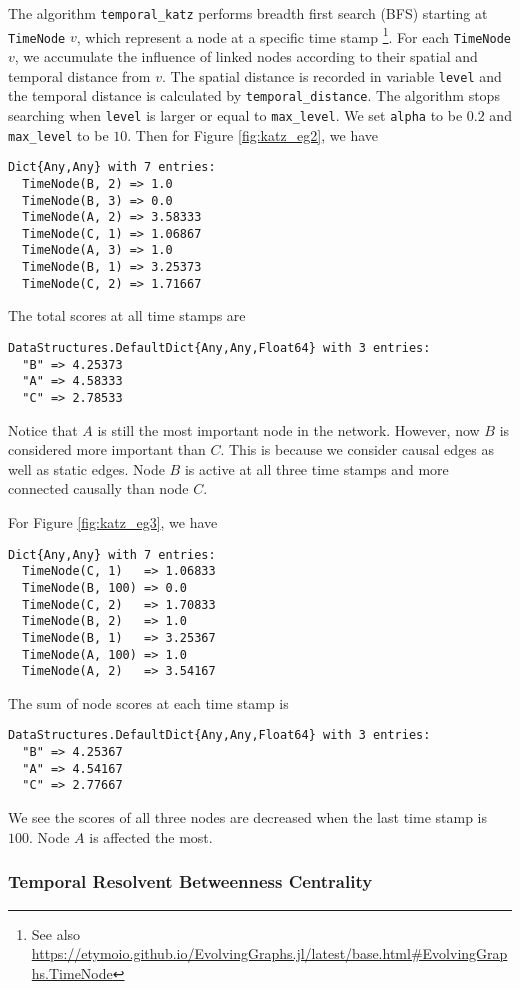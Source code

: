 \documentclass[12pt]{article}
\theoremstyle{definition}
\begin{document}
The algorithm \texttt{temporal\_katz} performs breadth first search (BFS) starting at \texttt{TimeNode} $v$, which represent a node at a specific time stamp \footnote{See also \url{https://etymoio.github.io/EvolvingGraphs.jl/latest/base.html#EvolvingGraphs.TimeNode}}.
For each \texttt{TimeNode} $v$, we accumulate the influence of linked nodes according to their spatial and temporal
distance from $v$. The spatial distance is recorded in variable \texttt{level} and the temporal distance is calculated by
\texttt{temporal\_distance}. The algorithm stops searching when \texttt{level} is larger or equal to \texttt{max\_level}.
We set \texttt{alpha} to be $0.2$ and \texttt{max\_level} to be $10$. Then
for Figure \ref{fig:katz_eg2}, we have
\begin{lstlisting}
Dict{Any,Any} with 7 entries:
  TimeNode(B, 2) => 1.0
  TimeNode(B, 3) => 0.0
  TimeNode(A, 2) => 3.58333
  TimeNode(C, 1) => 1.06867
  TimeNode(A, 3) => 1.0
  TimeNode(B, 1) => 3.25373
  TimeNode(C, 2) => 1.71667
\end{lstlisting}
The total scores at all time stamps are
\begin{lstlisting}
DataStructures.DefaultDict{Any,Any,Float64} with 3 entries:
  "B" => 4.25373
  "A" => 4.58333
  "C" => 2.78533
\end{lstlisting}
Notice that $A$ is still the most important node in the network. However, now $B$ is considered more important
than $C$. This is because we consider causal edges as well as static edges. Node $B$ is active at all three time stamps
and more connected causally than node $C$.

For Figure \ref{fig:katz_eg3}, we have
\begin{lstlisting}
Dict{Any,Any} with 7 entries:
  TimeNode(C, 1)   => 1.06833
  TimeNode(B, 100) => 0.0
  TimeNode(C, 2)   => 1.70833
  TimeNode(B, 2)   => 1.0
  TimeNode(B, 1)   => 3.25367
  TimeNode(A, 100) => 1.0
  TimeNode(A, 2)   => 3.54167
\end{lstlisting}
The sum of node scores at each time stamp is
\begin{lstlisting}
DataStructures.DefaultDict{Any,Any,Float64} with 3 entries:
  "B" => 4.25367
  "A" => 4.54167
  "C" => 2.77667
\end{lstlisting}
We see the scores of all three nodes are decreased when the last time stamp is $100$.
Node $A$ is affected the most.

\subsubsection{Temporal Resolvent Betweenness Centrality}
\end{document}
